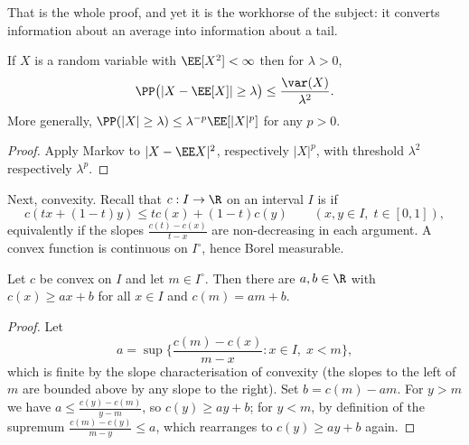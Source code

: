 That is the whole proof, and yet it is the workhorse of the subject: it converts information about an average into information about a tail.

\begin{corollary}
	If $X$ is a random variable with $\EE[X^2] < \infty$ then for $\lambda>0$,
	$$
	\PP\big( |X - \EE[X]| \geq \lambda\big) \leq \frac{\var(X)}{\lambda^2}.
	$$
	More generally, $\PP(|X| \geq \lambda) \leq \lambda^{-p}\EE[|X|^p]$ for any $p > 0$.
\end{corollary}
\begin{proof}
	Apply Markov to $|X - \EE X|^2$, respectively $|X|^p$, with threshold $\lambda^2$ respectively $\lambda^p$.
\end{proof}

Next, convexity. Recall that $c : I \to \R$ on an interval $I$ is  if
$$
c(tx + (1-t)y) \leq tc(x)+(1-t)c(y) \qquad (x,y \in I,\; t\in[0,1]),
$$
equivalently if the slopes $\frac{c(t)-c(x)}{t-x}$ are non-decreasing in each argument. A convex function is continuous on $I^\circ$, hence Borel measurable.

\begin{lemma}\label{lem:support}
	Let $c$ be convex on $I$ and let $m \in I^\circ$. Then there are $a,b\in\R$ with $c(x) \geq ax+b$ for all $x \in I$ and $c(m)=am+b$.
\end{lemma}
\begin{proof}
	Let
	$$
	a = \sup\Big\{ \frac{c(m)-c(x)}{m-x} : x \in I, \; x<m\Big\},
	$$
	which is finite by the slope characterisation of convexity (the slopes to the left of $m$ are bounded above by any slope to the right). Set $b = c(m)-am$. For $y>m$ we have $a \leq \frac{c(y)-c(m)}{y-m}$, so $c(y)\geq ay+b$; for $y<m$, by definition of the supremum $\frac{c(m)-c(y)}{m-y}\leq a$, which rearranges to $c(y)\geq ay+b$ again.
\end{proof}

\begin{center}
\end{center}

